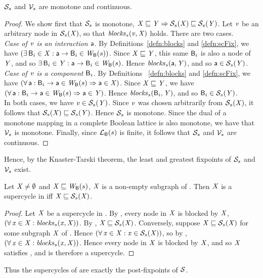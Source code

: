 \begin{proposition} \label{prop:monotone}
$\mathcal{S}_s$ and $\mathcal{V}_s$ are monotone and continuous.
\end{proposition}
%
\begin{proof}
We show first that $\mathcal{S}_s$ is monotone, \ie $\mathit{X} \sqsubseteq \mathit{Y} \Rightarrow \mathcal{S}_{s}(\mathit{X}) \sqsubseteq \mathcal{S}_{s}(\mathit{Y})$.
Let $\mathit{v}$ be an arbitrary node in $\mathcal{S}_{s}(\mathit{X})$, so that $\mathit{blocks}_{s}(\mathit{v}, \mathit{X})$ holds. There are two cases.\\

\emph{Case of $\mathit{v}$ is an interaction $\mathsf{a}$}. By Definitions~\ref{defn:blocks} and \ref{defn:scFix}, we have $(\exists\, \mathsf{B}_i \in \mathit{X}  : \mathsf{a} \rightarrow \mathsf{B}_i \in \mathit{W}_{\mathsf{B}}({s}))$.
Since $\mathit{X} \sqsubseteq \mathit{Y}$, this same $\mathsf{B}_i$ is also a node of $\mathit{Y}$, and so  $\exists\, \mathsf{B}_i \in \mathit{Y}  : \mathsf{a} \rightarrow \mathsf{B}_i \in \mathit{W}_{\mathsf{B}}({s})$. 
Hence  $\mathit{blocks}_{s}(\mathsf{a}, \mathit{Y})$, and so $\mathsf{a} \in \mathcal{S}_{s}(\mathit{Y})$. \\

\emph{Case of $\mathit{v}$ is a component $\mathsf{B}_i$}. By Definitions~ \ref{defn:blocks} and \ref{defn:scFix}, we have $(\forall\, \mathsf{a} : \mathsf{B}_i \rightarrow \mathsf{a} \in \mathit{W}_{\mathsf{B}}({s}) \Rightarrow \mathsf{a} \in \mathit{X})$.
Since $\mathit{X} \sqsubseteq \mathit{Y}$, we have  $(\forall\, \mathsf{a} : \mathsf{B}_i \rightarrow \mathsf{a} \in \mathit{W}_{\mathsf{B}}({s}) \Rightarrow \mathsf{a} \in \mathit{Y})$. 
Hence $\mathit{blocks}_{s}(\mathsf{B}_i, \mathit{Y})$, and so $\mathsf{B}_i \in \mathcal{S}_{s}(\mathit{Y})$. \\

In both cases, we have $\mathit{v} \in \mathcal{S}_{s}(\mathit{Y})$. Since $\mathit{v}$ was chosen arbitrarily from $\mathcal{S}_{s}(\mathit{X}) $, it follows that $\mathcal{S}_{s}(\mathit{X}) \sqsubseteq \mathcal{S}_{s}(\mathit{Y})$. Hence
$\mathcal{S}_s$ is monotone.
%
Since the dual of a monotone mapping in a complete Boolean lattice is also monotone, we have that $\mathcal{V}_s$ is monotone.
%
Finally, since $\mathcal{L}_{\mathsf{B}}({s})$ is finite, it follows that $\mathcal{S}_s$ and $\mathcal{V}_s$ are continuous.
\end{proof}

Hence, by the Knaster-Tarski theorem, the least and greatest fixpoints of $\mathcal{S}_s$ and $\mathcal{V}_s$ exist.

\begin{proposition} \label{prop:supercycleGFP}
Let $\mathit{X} \ne \emptyset$ and $\mathit{X} \sqsubseteq \mathit{W}_{\mathsf{B}}({s})$, \ie $\mathit{X}$ is a non-empty subgraph of . Then $\mathit{X}$ is a supercycle in  iff $\mathit{X} \sqsubseteq \mathcal{S}_{s}(\mathit{X})$.
\end{proposition}
%
\begin{proof}
Let $\mathit{X}$ be a supercycle in . By , every node in $\mathit{X}$ is blocked by $\mathit{X}$, \ie 
$(\forall\, \mathit{x} \in \mathit{X}: \mathit{blocks}_{s}(\mathit{x}, \mathit{X}))$. By , $\mathit{X} \sqsubseteq \mathcal{S}_{s}(\mathit{X})$.
%
Conversely, suppose $\mathit{X} \sqsubseteq \mathcal{S}_{s}(\mathit{X})$ for some subgraph $\mathit{X}$ of . Hence 
$(\forall\, \mathit{x} \in \mathit{X}: \mathit{x} \in \mathcal{S}_{s}(\mathit{X}))$, so by , $(\forall\, \mathit{x} \in \mathit{X}: \mathit{blocks}_{s}(\mathit{x}, \mathit{X}))$.
Hence every node in $\mathit{X}$ is blocked by $\mathit{X}$, and so $\mathit{X}$ satisfies , and is therefore a supercycle.
\end{proof}
%
Thus the supercycles of  are exactly the post-fixpoints of $\mathcal{S}$. %


